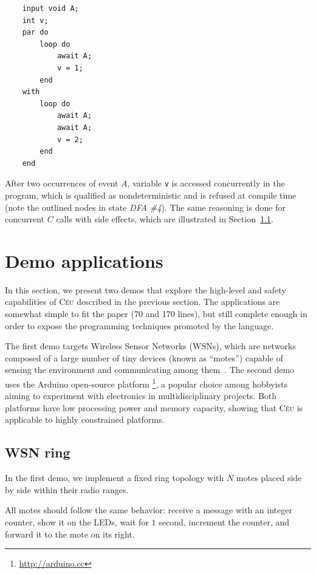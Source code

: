 \documentclass{sig-alternate}
\newcommand{\2}{\;\;}
\newcommand{\5}{\;\;\;\;\;}
\newcommand{\CEU}{\textsc{C\'{e}u}}
\newcommand{\code}[1] {{\small{\texttt{#1}}}}
\begin{document}
{\small
\begin{verbatim}
    input void A;
    int v;
    par do
        loop do
            await A;
            v = 1;
        end
    with
        loop do
            await A;
            await A;
            v = 2;
        end
    end
\end{verbatim}
}

After two occurrences of event $A$, variable \code{v} is accessed concurrently 
in the program, which is qualified as nondeterministic and is refused at 
compile time (note the outlined nodes in state \emph{DFA \#4}).
The same reasoning is done for concurrent $C$ calls with side effects, which 
are illustrated in Section~\ref{sec:demos:ring}.

\section{Demo applications}
\label{sec:demos}

In this section, we present two demos %
that explore the high-level and safety capabilities of \CEU{} described in the
previous section.
The applications are somewhat simple to fit the paper (70 and 170 lines), but 
still complete enough in order to expose the programming techniques promoted by 
the language.

The first demo targets Wireless Sensor Networks (WSNs), which are networks 
composed of a large number of tiny devices (known as ``motes'') capable of 
sensing the environment and communicating among them~\cite{wsn.survey}.
The second demo uses the Arduino open-source platform%
\footnote{\url{http://arduino.cc}},
a popular choice among hobbyists aiming to experiment with electronics in 
multidisciplinary projects.
Both platforms have low processing power and memory capacity, showing that 
\CEU{} is applicable to highly constrained platforms.

\subsection{WSN ring}
\label{sec:demos:ring}

In the first demo, we implement a fixed ring topology with $N$ motes placed 
side by side within their radio ranges.

All motes should follow the same behavior: receive a message with an integer 
counter, show it on the LEDs, wait for $1$ second, increment the counter, and 
forward it to the mote on its right.
\end{document}
